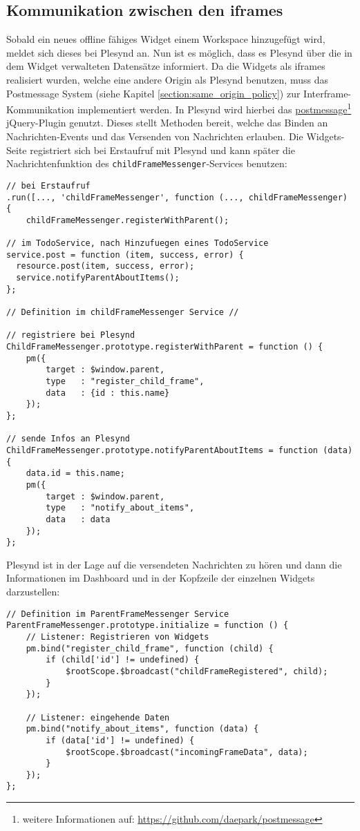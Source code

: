 \subsection{Kommunikation zwischen den iframes}\label{section:kommunikation_zwischen_iframes_implementierung}
Sobald ein neues offline fähiges Widget einem Workspace hinzugefügt wird, meldet sich dieses bei Plesynd an. Nun ist es möglich, dass es Plesynd über die in dem Widget verwalteten Datensätze informiert. Da die Widgets als iframes realisiert wurden, welche eine andere Origin als Plesynd benutzen, muss das Postmessage System (siehe Kapitel \ref{section:same_origin_policy}) zur Interframe-Kommunikation implementiert werden. In Plesynd wird hierbei das \href{https://github.com/daepark/postmessage}{postmessage}\footnote{weitere Informationen auf: \url{https://github.com/daepark/postmessage}} jQuery-Plugin genutzt. Dieses stellt Methoden bereit, welche das Binden an Nachrichten-Events und das Versenden von Nachrichten erlauben. Die Widgets-Seite registriert sich bei Erstaufruf mit Plesynd und kann später die Nachrichtenfunktion des \texttt{childFrameMessenger}-Services benutzen:
\begin{lstlisting}
// bei Erstaufruf
.run([..., 'childFrameMessenger', function (..., childFrameMessenger) {
    childFrameMessenger.registerWithParent();
    
// im TodoService, nach Hinzufuegen eines TodoService
service.post = function (item, success, error) {
  resource.post(item, success, error);
  service.notifyParentAboutItems();
};
   
// Definition im childFrameMessenger Service //

// registriere bei Plesynd
ChildFrameMessenger.prototype.registerWithParent = function () {
    pm({
        target : $window.parent,
        type   : "register_child_frame",
        data   : {id : this.name}
    });
};

// sende Infos an Plesynd
ChildFrameMessenger.prototype.notifyParentAboutItems = function (data) {
    data.id = this.name;
    pm({
        target : $window.parent,
        type   : "notify_about_items",
        data   : data
    });
};
\end{lstlisting}

Plesynd ist in der Lage auf die versendeten Nachrichten zu hören und dann die Informationen im Dashboard und in der Kopfzeile der einzelnen Widgets darzustellen:
\begin{lstlisting}
// Definition im ParentFrameMessenger Service
ParentFrameMessenger.prototype.initialize = function () {
    // Listener: Registrieren von Widgets
    pm.bind("register_child_frame", function (child) {
        if (child['id'] != undefined) {
            $rootScope.$broadcast("childFrameRegistered", child);
        }
    });

    // Listener: eingehende Daten
    pm.bind("notify_about_items", function (data) {
        if (data['id'] != undefined) {
            $rootScope.$broadcast("incomingFrameData", data);
        }
    });
};
\end{lstlisting}